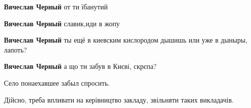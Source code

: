 \begin{itemize}
 
\textbf{Вячеслав Черный} от ти їбанутий

 
\textbf{Вячеслав Черный} славик,иди в жопу

 
\textbf{Вячеслав Черный} ты ещё в киевским кислородом дышишь или уже в дыныры, лапоть?

 
\textbf{Вячеслав Черный} а що ти забув в Києві, скрєпа?

 
Село понаехавшее забыл спросить.
\end{itemize}

 
Дійсно, треба впливати на керівництво закладу, звільняти таких викладачів.

 
